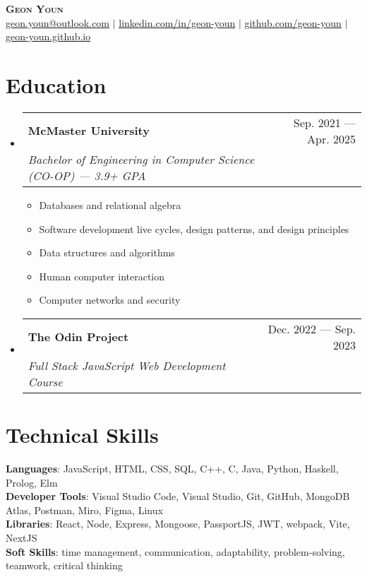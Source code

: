 \documentclass[letterpaper,11pt]{article}
\makeatletter
\newcommand{\resumeItem}[1]{
	\item\small{
		{#1 \vspace{-2pt}}
	}
}
\newcommand{\resumeSubheading}[4]{
	\vspace{-2pt}\item
	\begin{tabular*}{0.97\textwidth}[t]{l@{\extracolsep{\fill}}r}
		\textbf{#1} & #2 \\
		\textit{\small#3} & \textit{\small #4} \\
	\end{tabular*}\vspace{-7pt}
}
\newcommand{\resumeSubHeadingListStart}{\begin{itemize}[leftmargin=0.15in,
			label={}]}
\newcommand{\resumeSubHeadingListEnd}{\end{itemize}}
\newcommand{\resumeItemListStart}{\begin{itemize}}
\newcommand{\resumeItemListEnd}{\end{itemize}\vspace{-5pt}}
\makeatother
\begin{document}
\begin{center}
	\textbf{\Huge \scshape Geon Youn} \\ \vspace{1pt}
	\small
	\href{mailto:geon.youn@outlook.com}{\underline{geon.youn@outlook.com}}
	$|$
	\href{https://linkedin.com/in/geon-youn}{\underline{linkedin.com/in/geon-youn}}
	$|$
	\href{https://github.com/geon-youn}{\underline{github.com/geon-youn}}
  $|$
  \href{https://geon-youn.github.io/}{\underline{geon-youn.github.io}}
\end{center}

\section{Education}
\resumeSubHeadingListStart
\resumeSubheading
{McMaster University}{Sep. 2021 --- Apr. 2025}
{Bachelor of Engineering in Computer Science (CO-OP) --- 3.9+ GPA}{}
\resumeItemListStart
\resumeItem{Databases and relational algebra}
\resumeItem{Software development live cycles, design patterns, and design principles}
\resumeItem{Data structures and algorithms}
\resumeItem{Human computer interaction}
\resumeItem{Computer networks and security}
\resumeItemListEnd
\resumeSubheading
{The Odin Project}{Dec. 2022 --- Sep. 2023}
{Full Stack JavaScript Web Development Course}{}
\resumeSubHeadingListEnd

\section{Technical Skills}
\begin{itemize}[leftmargin=0.15in, label={}]
	\small{\item{
		            \textbf{Languages}{: JavaScript, HTML, CSS, SQL, C++, C, Java, Python, Haskell,
			            Prolog, Elm} \\
		            \textbf{Developer Tools}{: Visual Studio Code, Visual Studio, Git, GitHub, MongoDB Atlas, Postman, Miro, Figma, Linux} \\
		            \textbf{Libraries}{: React, Node, Express, Mongoose, PassportJS, JWT, webpack, Vite, NextJS} \\
		            \textbf{Soft Skills}{: time management,
			            communication, adaptability,
			            problem-solving, teamwork, critical thinking}
		      }}
\end{itemize}
\end{document}
